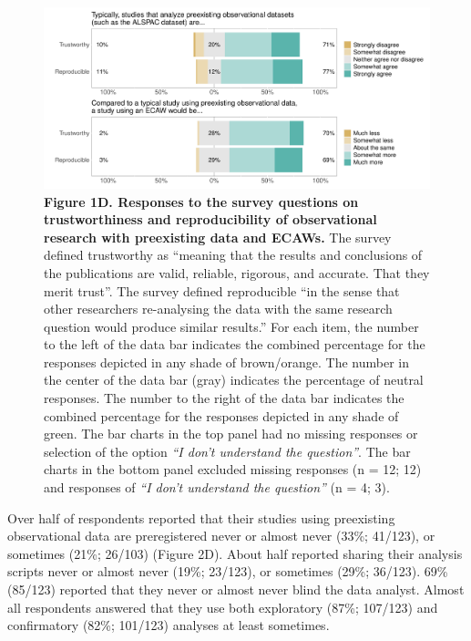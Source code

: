 \documentclass[
  man,floatsintext]{apa6}
\begin{document}
\begin{figure}

{\centering \includegraphics[width=1\linewidth]{figs/typicallyEcawPlotAll-1} 

}

\caption{\textbf{Figure 1D. Responses to the survey questions on trustworthiness and reproducibility of observational research with preexisting data and ECAWs.} The survey defined trustworthy as ``meaning that the results and conclusions of the publications are valid, reliable, rigorous, and accurate. That they merit trust''. The survey defined reproducible ``in the sense that other researchers re-analysing the data with the same research question would produce similar results.'' For each item, the number to the left of the data bar indicates the combined percentage for the responses depicted in any shade of brown/orange. The number in the center of the data bar (gray) indicates the percentage of neutral responses. The number to the right of the data bar indicates the combined percentage for the responses depicted in any shade of green. The bar charts in the top panel had no missing responses or selection of the option \emph{``I don't understand the question''}. The bar charts in the bottom panel excluded missing responses (n = 12; 12) and responses of \emph{``I don't understand the question''} (n = 4; 3).}\label{fig:typicallyEcawPlotAll}
\end{figure}



Over half of respondents reported that their studies using preexisting observational data are preregistered never or almost never (33\%; 41/123), or sometimes (21\%; 26/103) (Figure 2D). About half reported sharing their analysis scripts never or almost never (19\%; 23/123), or sometimes (29\%; 36/123). 69\% (85/123) reported that they never or almost never blind the data analyst. Almost all respondents answered that they use both exploratory (87\%; 107/123) and confirmatory (82\%; 101/123) analyses at least sometimes.
\end{document}
